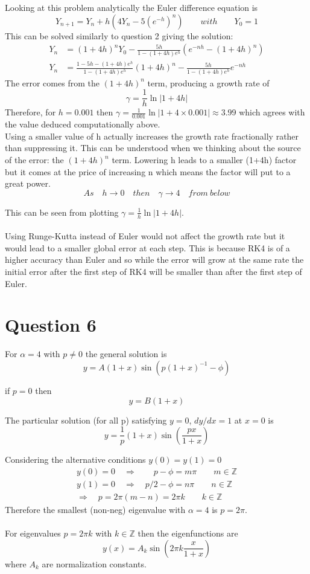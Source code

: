 \documentclass[a4paper]{article}
\begin{document}
\pagebreak
Looking at this problem analytically the Euler difference equation is
\[ Y_{n+1} = Y_n + h(4Y_n - 5(e^{-h})^n) \qquad with \qquad Y_0=1 \]
This can be solved similarly to question 2 giving the solution:
\begin{align*}
Y_n &= (1+4h)^nY_0 - \frac{5h}{1-(1+4h)e^h} (e^{-nh} - (1+4h)^n) \\
Y_n &= \frac{1-5h-(1+4h)e^h}{1-(1+4h)e^h} (1+4h)^n - \frac{5h}{1-(1+4h)e^h}e^{-nh}
\end{align*}
The error comes from the $(1+4h)^n$ term, producing a growth rate of
\[ \gamma = \frac{1}{h}\ln|1+4h| \]
Therefore, for $h=0.001$ then $\gamma=\frac{1}{0.001}\ln|1+4\times0.001|\approx3.99$ which agrees with the value deduced computationally above.\\

Using a smaller value of h actually increases the growth rate fractionally rather than suppressing it. This can be understood when we thinking about the source of the error: the $(1+4h)^n$ term. Lowering h leads to a smaller (1+4h) factor but it comes at the price of increasing n which means the factor will put to a great power.
\[ As \quad h\rightarrow0 \quad then \quad \gamma\rightarrow4 \quad from\ below \]

This can be seen from plotting $\gamma = \frac{1}{h}\ln|1+4h|$.
\\ \\
Using Runge-Kutta instead of Euler would not affect the growth rate but it would lead to a smaller global error at each step. This is because RK4 is of a higher accuracy than Euler and so while the error will grow at the same rate the initial error after the first step of RK4 will be smaller than after the first step of Euler.

\section*{Question 6}

For $\alpha=4$ with $p\neq0$ the general solution is
\[ y = A(1+x)\sin(p(1+x)^{-1}-\phi) \]

if $p=0$ then
\[ y = B(1+x) \]

The particular solution (for all p) satisfying $y=0$, $dy/dx=1$ at $x=0$ is
\[ y = \frac{1}{p}(1+x)\sin(\frac{px}{1+x}) \]

Considering the alternative conditions $y(0) = y(1) = 0$
\begin{gather*}
  y(0) = 0 \quad\Rightarrow\qquad  p -\phi = m\pi \qquad m \in \mathbb{Z} \\
  y(1) = 0 \quad\Rightarrow\quad  p/2-\phi = n\pi \qquad n \in \mathbb{Z} \\
  \Rightarrow \quad p = 2\pi(m-n) = 2\pi k \qquad k \in \mathbb{Z}
\end{gather*}
Therefore the smallest (non-neg) eigenvalue with $\alpha = 4$ is $p=2\pi$. \\ \\
For eigenvalues $p=2\pi k$ with $k\in \mathbb{Z}$ then the eigenfunctions are
\[ y(x) = A_k\sin(2\pi k\frac{x}{1+x}) \]
where $A_k$ are normalization constants.
\end{document}
